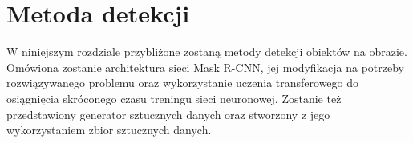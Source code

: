 \chapter{Metoda detekcji}
W niniejszym rozdziale przybliżone zostaną metody detekcji obiektów na obrazie.
Omówiona zostanie architektura sieci Mask R-CNN, jej modyfikacja na potrzeby rozwiązywanego problemu oraz wykorzystanie uczenia transferowego do osiągnięcia skróconego czasu treningu sieci neuronowej.
Zostanie też przedstawiony generator sztucznych danych oraz stworzony z jego wykorzystaniem zbior sztucznych danych.
